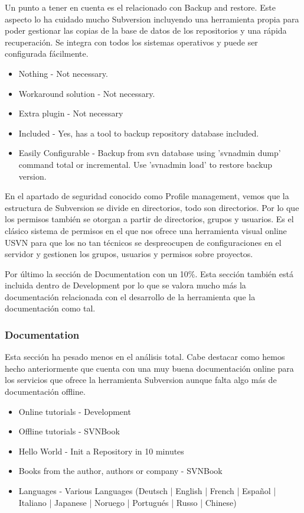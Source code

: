 \documentclass[11pt]{scrartcl}
\begin{document}
\par Un punto a tener en cuenta es el relacionado con Backup and restore. Este aspecto lo ha cuidado mucho Subversion incluyendo una herramienta propia para poder gestionar las copias de la base de datos de los repositorios y una r\'apida recuperaci\'on. Se integra con todos los sistemas operativos y puede ser configurada f\'acilmente.

\begin{itemize}
    \item Nothing - Not necessary.
    \item Workaround solution - Not necessary.
    \item Extra plugin - Not necessary
    \item Included - Yes, has a tool to backup repository database included.
    \item Easily Configurable - Backup from svn database using 'svnadmin dump' command total or incremental. Use 'svnadmin load' to restore backup version.
\end{itemize}

\par En el apartado de seguridad conocido como Profile management, vemos que la estructura de Subversion se divide en directorios, todo son directorios. Por lo que los permisos tambi\'en se otorgan a partir de directorios, grupos y usuarios. Es el cl\'asico sistema de permisos en el que nos ofrece una herramienta visual online USVN para que los no tan t\'ecnicos se despreocupen de configuraciones en el servidor y gestionen los grupos, usuarios y permisos sobre proyectos.

\par Por \'ultimo la secci\'on de Documentation con un 10\%. Esta secci\'on tambi\'en est\'a incluida dentro de Development por lo que se valora mucho m\'as la documentaci\'on relacionada con el desarrollo de la herramienta que la documentaci\'on como tal.

\subsubsection{Documentation}

\par Esta secci\'on ha pesado menos en el an\'alisis total. Cabe destacar como hemos hecho anteriormente que cuenta con una muy buena documentaci\'on online para los servicios que ofrece la herramienta Subversion aunque falta algo m\'as de documentaci\'on offline.

\begin{itemize}
    \item Online tutorials - Development
    \item Offline tutorials - SVNBook
    \item Hello World - Init a Repository in 10 minutes
    \item Books from the author, authors or company - SVNBook
    \item Languages - Various Languages (Deutsch | English | French | Espa\~nol | Italiano | Japanese | Noruego | Portugu\'es | Russo | Chinese)
\end{itemize}
\end{document}
